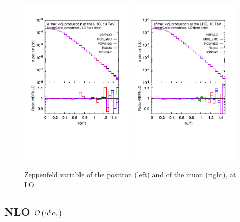 \documentclass[a4paper,10pt]{report}
\begin{document}
\begin{figure}[h!]
   \centering
   \includegraphics[width=0.49\textwidth,angle=0,clip=true,trim={0.4cm 2.5cm 0.6cm 1.cm}]{figures/ze_LO.pdf}
   \includegraphics[width=0.49\textwidth,angle=0,clip=true,trim={0.4cm 2.5cm 0.6cm 1.cm}]{figures/zmu_LO.pdf}
\caption{\label{fig:zel-muLO}Zeppenfeld variable of the positron (left) and of the muon (right), at LO.
}
\end{figure}



\subsection{NLO $\mathcal{O}\left(\alpha^6\alpha_{\rm s}\right)$}
\end{document}
